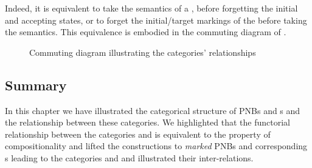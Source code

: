 Indeed, it is equivalent to take the \TNFA{} semantics of a \mPNB{}, before
forgetting the initial and accepting states, or to forget the initial/target
markings of the \mPNB before taking the \TLTS{} semantics. This equivalence is
embodied in the commuting diagram of .

\begin{figure}[ht]
    \centering
{}
\caption{Commuting diagram illustrating the categories' relationships}
\label{fig:categoryRelationships}
\end{figure}

\subsection{Summary}

In this chapter we have illustrated the categorical structure of PNBs and
\TLTS{}s and the relationship between these categories. We highlighted that the
functorial relationship between the categories \PNBCat{} and \TLTSCat{} is
equivalent to the property of compositionality and lifted the constructions to
\emph{marked} PNBs and corresponding \TNFA{}s leading to the categories
\mPNBCat{} and \TNFACat{} and illustrated their inter-relations.
